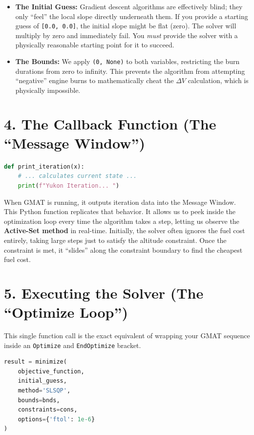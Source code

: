\documentclass[11pt, letterpaper]{article}
\begin{document}
\begin{itemize}
    \item \textbf{The Initial Guess:} Gradient descent algorithms are effectively blind; they only ``feel'' the local slope directly underneath them. If you provide a starting guess of \texttt{[0.0, 0.0]}, the initial slope might be flat (zero). The solver will multiply by zero and immediately fail. You \textit{must} provide the solver with a physically reasonable starting point for it to succeed.
    \item \textbf{The Bounds:} We apply \texttt{(0, None)} to both variables, restricting the burn durations from zero to infinity. This prevents the algorithm from attempting ``negative'' engine burns to mathematically cheat the $\Delta V$ calculation, which is physically impossible.
\end{itemize}

\section*{4. The Callback Function (The ``Message Window'')}

\begin{lstlisting}[language=Python]
def print_iteration(x):
    # ... calculates current state ...
    print(f"Yukon Iteration... ")
\end{lstlisting}

When GMAT is running, it outputs iteration data into the Message Window. This Python function replicates that behavior. It allows us to peek inside the optimization loop every time the algorithm takes a step, letting us observe the \textbf{Active-Set method} in real-time. Initially, the solver often ignores the fuel cost entirely, taking large steps just to satisfy the altitude constraint. Once the constraint is met, it ``slides'' along the constraint boundary to find the cheapest fuel cost.

\section*{5. Executing the Solver (The ``Optimize Loop'')}

This single function call is the exact equivalent of wrapping your GMAT sequence inside an \texttt{Optimize} and \texttt{EndOptimize} bracket.

\begin{lstlisting}[language=Python]
result = minimize(
    objective_function, 
    initial_guess, 
    method='SLSQP', 
    bounds=bnds, 
    constraints=cons, 
    options={'ftol': 1e-6}
)
\end{lstlisting}
\end{document}
